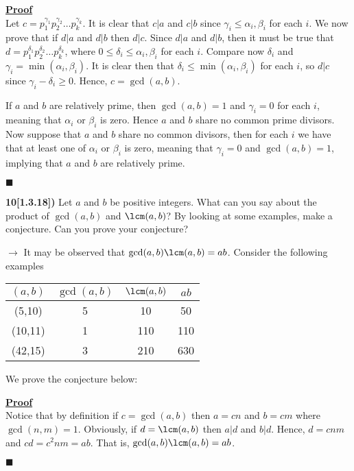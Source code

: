 \documentclass[12pt,a4paper]{article}
\newcommand{\prob}[2]{\textbf{#1)} #2}
\newenvironment{proof}
{
\textbf{\underline{Proof}} \\
}
{
\begin{flushright}
$\blacksquare$
\end{flushright}}
\begin{document}
\begin{proof}
Let $c = p_1^{\gamma_1}p_2^{\gamma_2}\hdots p_k^{\gamma_k}$. It is clear that $c|a$ and $c|b$ since $\gamma_i \leq \alpha_i,\beta_i$ for each $i$. We now prove that if $d|a$ and $d|b$ then $d|c$. Since $d|a$ and $d|b$, then it must be true that $d = p_1^{\delta_1}p_2^{\delta_2}\hdots p_k^{\delta_k}$, where $0 \leq \delta_i \leq \alpha_i,\beta_i$ for each $i$. Compare now $\delta_i$ and $\gamma_i = \min(\alpha_i,\beta_i)$. It is clear then that $\delta_i \leq \min(\alpha_i,\beta_i)$ for each $i$, so $d|c$ since $\gamma_i - \delta_i \geq 0$. Hence, $c = \gcd(a,b)$.

If $a$ and $b$ are relatively prime, then $\gcd(a,b) = 1$ and $\gamma_i = 0$ for each $i$, meaning that $\alpha_i$ or $\beta_i$ is zero. Hence $a$ and $b$ share no common prime divisors. Now suppose that $a$ and $b$ share no common divisors, then for each $i$ we have that at least one of $\alpha_i$ or $\beta_i$ is zero, meaning that $\gamma_i = 0$ and $\gcd(a,b) = 1$, implying that $a$ and $b$ are relatively prime.
\end{proof}

\prob{10[1.3.18]}{Let $a$ and $b$ be positive integers. What can you say about the product of $\gcd(a,b)$ and $\lcm(a,b)$? By looking at some examples, make a conjecture. Can you prove your conjecture?}

$\rightarrow$ It may be observed that $\gcd(a,b)\lcm(a,b) = ab$. Consider the following examples

\begin{table}[H]
\begin{center}
\begin{tabular}{c|c|c|c}
$(a,b)$ & $\gcd(a,b)$ & $\lcm(a,b)$ & $ab$ \\
\hline
(5,10) & 5 & 10 & 50 \\
(10,11) & 1 & 110 & 110 \\
(42,15) & 3 & 210 & 630 \\
\end{tabular}
\end{center}
\end{table}

We prove the conjecture below:

\begin{proof}
Notice that by definition if $c = \gcd(a,b)$ then $a = cn$ and $b = cm$ where $\gcd(n,m) = 1$. Obviously, if $d = \lcm(a,b)$ then $a|d$ and $b|d$. Hence, $d = cnm$ and $cd = c^2nm = ab$. That is, $\gcd(a,b)\lcm(a,b) = ab$.
\end{proof}
\end{document}
